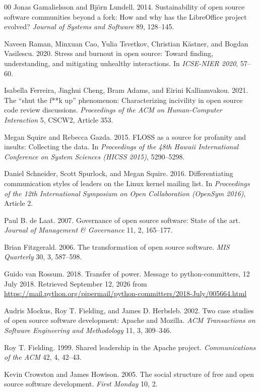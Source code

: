 \documentclass[sigconf,screen]{acmart}
\begin{document}
\begin{thebibliography}{00}
Jonas Gamalielsson and Bj\"orn Lundell. 2014. Sustainability of open source software communities beyond a fork: How and why has the LibreOffice project evolved? \emph{Journal of Systems and Software} 89, 128--145.

Naveen Raman, Minxuan Cao, Yulia Tsvetkov, Christian K\"astner, and Bogdan Vasilescu. 2020. Stress and burnout in open source: Toward finding, understanding, and mitigating unhealthy interactions. In \emph{ICSE-NIER 2020}, 57--60.

Isabella Ferreira, Jinghui Cheng, Bram Adams, and Eirini Kalliamvakou. 2021. The ``shut the f**k up'' phenomenon: Characterizing incivility in open source code review discussions. \emph{Proceedings of the ACM on Human-Computer Interaction} 5, CSCW2, Article 353.

Megan Squire and Rebecca Gazda. 2015. FLOSS as a source for profanity and insults: Collecting the data. In \emph{Proceedings of the 48th Hawaii International Conference on System Sciences (HICSS 2015)}, 5290--5298.

Daniel Schneider, Scott Spurlock, and Megan Squire. 2016. Differentiating communication styles of leaders on the Linux kernel mailing list. In \emph{Proceedings of the 12th International Symposium on Open Collaboration (OpenSym 2016)}, Article 2.

Paul B. de Laat. 2007. Governance of open source software: State of the art. \emph{Journal of Management \& Governance} 11, 2, 165--177.

Brian Fitzgerald. 2006. The transformation of open source software. \emph{MIS Quarterly} 30, 3, 587--598.

Guido van Rossum. 2018. Transfer of power. Message to python-committers, 12 July 2018. Retrieved September 12, 2026 from \url{https://mail.python.org/pipermail/python-committers/2018-July/005664.html}

Audris Mockus, Roy T. Fielding, and James D. Herbsleb. 2002. Two case studies of open source software development: Apache and Mozilla. \emph{ACM Transactions on Software Engineering and Methodology} 11, 3, 309--346.

Roy T. Fielding. 1999. Shared leadership in the Apache project. \emph{Communications of the ACM} 42, 4, 42--43.

Kevin Crowston and James Howison. 2005. The social structure of free and open source software development. \emph{First Monday} 10, 2.


\end{thebibliography}
\end{document}

